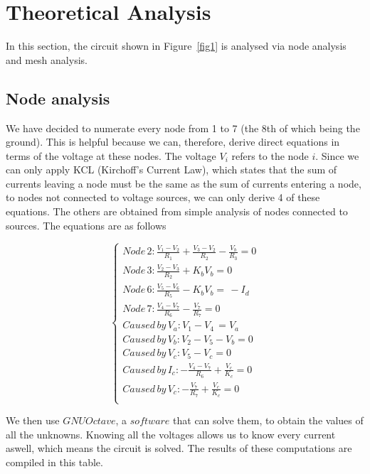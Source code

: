 \section{Theoretical Analysis}
\label{sec:analysis}

In this section, the circuit shown in Figure~\ref{fig1} is analysed via node analysis and mesh analysis.

\subsection{Node analysis}

We have decided to numerate every node from 1 to 7 (the 8th of which being the ground). This is helpful because we can, therefore, derive direct equations in terms of the voltage at these nodes.
The voltage $V_i$ refers to the node $i$. Since we can only apply KCL (Kirchoff's Current Law), which states that the sum of currents leaving a node must be the same as the sum of currents entering a node, to nodes not connected to voltage sources, we can only derive 4 of these equations. The others are obtained from simple analysis of nodes connected to sources. The equations are as follows

\begin{equation} 
\begin{cases}  
    Node\, 2: \frac{V_1 - V_2}{R_1} + \frac{V_3 - V_2}{R_2} - \frac{V_b}{R_3} = 0 \\
    Node\, 3: \frac{V_2 - V_3}{R_2} + K_bV_b = 0 \\
    Node\, 6: \frac{V_5 - V_6}{R_5} - K_bV_b = \,  - I_d \\
    Node\, 7: \frac{V_4 - V_7}{R_6} - \frac{V_7}{R_7} = 0 \\
    Caused\, by\, V_a : V_1 - V_4 \, = V_a \\
    Caused\, by\, V_b : V_2 - V_5 - V_b = 0 \\
    Caused\, by\, V_c : V_5 - V_c = 0 \\
    Caused\, by\, I_c : - \frac{V_4 - V_7}{R_6} + \frac{V_c}{K_c} = 0\\
    Caused\, by\, V_c : - \frac{V_7}{R_7} + \frac{V_c}{K_c}  = 0\\
\end{cases}
\label{eq:1}
\end{equation}

We then use $GNU Octave$, a $software$ that can solve them, to obtain the values of all the unknowns. Knowing all the voltages allows us to know every current aswell, which means the circuit is solved.
The results of these computations are compiled in this table.

